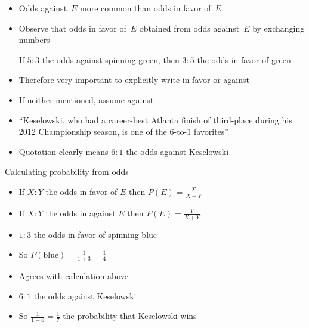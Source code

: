 \documentclass[handout]{beamer}
\theoremstyle{definition}
\begin{document}
\begin{frame}
\begin{itemize}
\item Odds against~$E$ more common than odds in favor of~$E$
\item Observe that odds in favor of~$E$ obtained
from odds against~$E$ by exchanging numbers
\begin{example} If $5:3$ the odds against spinning green,
then $3:5$ the odds in favor of green
\end{example}
\item Therefore very important to explicitly write
\alert{in favor} or \alert{against}
\item If neither mentioned, assume \alert{against}
\end{itemize}
\begin{example}
\begin{itemize}
\item ``Keselowski, who had a career-best Atlanta finish of third-place
during his 2012 Championship season, is one of the \alert{$6$-to-$1$} favorites''
\item Quotation clearly means $6:1$ the odds \alert{against} Keselowski
\end{itemize}
\end{example}
\end{frame}

\begin{frame}{Calculating probability from odds}
\begin{itemize}
\item If $X:Y$ the odds in favor of $E$
then $P\left(E\right)=\frac{X}{X+Y}$
\item If $X:Y$ the odds in against $E$
then $P\left(E\right)=\frac{Y}{X+Y}$
\end{itemize}
\begin{example}
\begin{itemize}
\item $1:3$ the odds in favor of spinning blue
\item So $P\left(\text{blue}\right)=\frac{1}{1+3}=\frac{1}{4}$
\item Agrees with calculation above
\end{itemize}
\end{example}
\begin{example}
\begin{itemize}
\item $6:1$ the odds against Keselowski
\item So $\frac{1}{1+6}=\frac{1}{7}$ the probability
that Keselowski wins
\end{itemize}
\end{example}
\end{frame}
\end{document}
